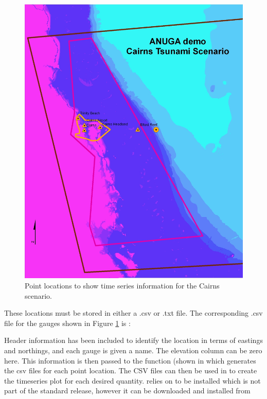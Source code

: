 \documentclass{manual}
\begin{document}
\begin{figure}[htp]
  \centerline{\includegraphics[scale=0.5]{graphics/cairnsgauges.jpg}}
  \caption{Point locations to show time series information for the Cairns scenario.}
  \label{fig:cairnsgauges}
\end{figure}

These locations
must be stored in either a .csv or .txt file. The corresponding .csv file for
the gauges shown in Figure \ref{fig:cairnsgauges} is :



Header information has been included to identify the location in terms of eastings and
northings, and each gauge is given a name. The elevation column can be zero here.
This information is then passed to the function  (shown in
 which generates the csv files for each point location. The CSV files
can then be used in  to create the timeseries plot for each desired
quantity.  relies on  to be installed which is not part
of the standard  release, however it can be downloaded and installed from 
\end{document}
